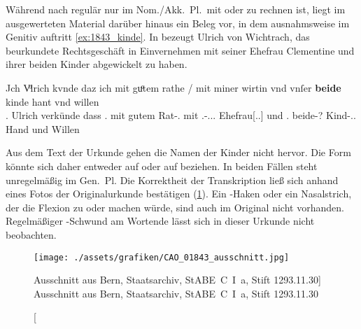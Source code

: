 \label{phsec:beidegen}
Während nach \citet[623]{ksw2} regulär nur im Nom./Akk.~Pl.\ mit 
oder  zu rechnen ist, liegt im ausgewerteten Material darüber
hinaus ein Beleg vor, in dem  ausnahmsweise im Genitiv auftritt
\cref{ex:1843_kinde}. In  \autocite{cao3} bezeugt
Ulrich von Wichtrach, das beurkundete Rechtsgeschäft in Einvernehmen mit seiner
Ehefrau Clementine und ihrer beiden Kinder abgewickelt zu haben.

\begin{exe}
\ex\label{ex:1843_kinde}
	\gll Jch Vͦlrich \textelp{} kvnde \textelp{} daz ich mit guͦtem rathe
			/ mit miner wirtin \textelp{} vnd vnſer \textbf{beide} kinde hant
			vnd willen \\
		\Fsg\subM.\Nom{} Ulrich {} verkünde {} dass \Fsg\subM.\Nom{} mit gutem
			Rat-\Dat.\Sg{} {} mit \Fsg\subM.\Gen-\Dat.\Sg.\FemF.\St{}
			Ehefrau[\Dat.\Sg.\FemF] {} und \Fpl\subMF.\Gen{} beide-?
			Kind-\Gen.\Pl.\NeutA{} Hand und Willen \\
	\begin{taggedline}{\parencites(Thun, Kt.~Bern, 1293)[\pno~1843, 146.11--13]{cao3}}
	\trans {}
	\end{taggedline}
\end{exe}

Aus dem Text der Urkunde gehen die Namen der Kinder nicht hervor. Die Form
 könnte sich daher entweder auf   oder auf
  beziehen. In beiden Fällen steht unregelmäßig
 im Gen.\ Pl. Die Korrektheit der Transkription ließ sich anhand
eines Fotos der Original\-urkunde bestätigen (\cref{fig:1843}). Ein
-Haken oder ein Nasalstrich, der die Flexion zu  oder
 machen würde, sind auch im Original nicht vorhanden.
Regelmäßiger -Schwund am Wortende \autocite[vgl.][171--172]{weinhold1863}
lässt sich in dieser Urkunde nicht beobachten.

\begin{figure}[h]
\centering
\texttt{[image: ./assets/grafiken/CAO\_01843\_ausschnitt.jpg]}
\caption%
	[Ausschnitt aus Bern, Staatsarchiv, StABE~C~I~a, Stift 1293.11.30]%
	{Ausschnitt aus Bern, Staatsarchiv, StABE~C~I~a, Stift 1293.11.30
		\autocites(Foto: Staatsarchiv Bern)[\pno~1843]{cao3}}
\label{fig:1843}
\end{figure}

